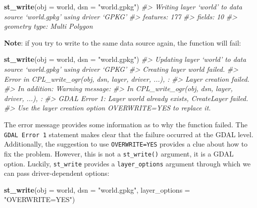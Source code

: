 \documentclass[]{krantz}
\newenvironment{Shaded}{\begin{snugshade}}{\end{snugshade}}
\newcommand{\CommentTok}[1]{\textcolor[rgb]{0.37,0.37,0.37}{\textit{#1}}}
\newcommand{\DataTypeTok}[1]{\textcolor[rgb]{0.27,0.27,0.27}{#1}}
\newcommand{\KeywordTok}[1]{\textcolor[rgb]{0.27,0.27,0.27}{\textbf{#1}}}
\newcommand{\NormalTok}[1]{#1}
\newcommand{\StringTok}[1]{\textcolor[rgb]{0.5,0.5,0.5}{#1}}
\begin{document}
\begin{Shaded}
\begin{Highlighting}[]
\KeywordTok{st_write}\NormalTok{(}\DataTypeTok{obj =}\NormalTok{ world, }\DataTypeTok{dsn =} \StringTok{"world.gpkg"}\NormalTok{)}
\CommentTok{#> Writing layer `world' to data source `world.gpkg' using driver `GPKG'}
\CommentTok{#> features:       177}
\CommentTok{#> fields:         10}
\CommentTok{#> geometry type:  Multi Polygon}
\end{Highlighting}
\end{Shaded}

\textbf{Note}: if you try to write to the same data source again, the function will fail:

\begin{Shaded}
\begin{Highlighting}[]
\KeywordTok{st_write}\NormalTok{(}\DataTypeTok{obj =}\NormalTok{ world, }\DataTypeTok{dsn =} \StringTok{"world.gpkg"}\NormalTok{)}
\CommentTok{#> Updating layer `world' to data source `world.gpkg' using driver `GPKG'}
\CommentTok{#> Creating layer world failed.}
\CommentTok{#> Error in CPL_write_ogr(obj, dsn, layer, driver, ...),  : }
\CommentTok{#>   Layer creation failed.}
\CommentTok{#> In addition: Warning message:}
\CommentTok{#> In CPL_write_ogr(obj, dsn, layer, driver, ...),  :}
\CommentTok{#>   GDAL Error 1: Layer world already exists, CreateLayer failed.}
\CommentTok{#> Use the layer creation option OVERWRITE=YES to replace it.}
\end{Highlighting}
\end{Shaded}

The error message provides some information as to why the function failed.
The \texttt{GDAL\ Error\ 1} statement makes clear that the failure occurred at the GDAL level.
Additionally, the suggestion to use \texttt{OVERWRITE=YES} provides a clue about how to fix the problem.
However, this is not a \texttt{st\_write()} argument, it is a GDAL option.
Luckily, \texttt{st\_write} provides a \texttt{layer\_options} argument through which we can pass driver-dependent options:

\begin{Shaded}
\begin{Highlighting}[]
\KeywordTok{st_write}\NormalTok{(}\DataTypeTok{obj =}\NormalTok{ world, }\DataTypeTok{dsn =} \StringTok{"world.gpkg"}\NormalTok{, }\DataTypeTok{layer_options =} \StringTok{"OVERWRITE=YES"}\NormalTok{)}
\end{Highlighting}
\end{Shaded}
\end{document}
